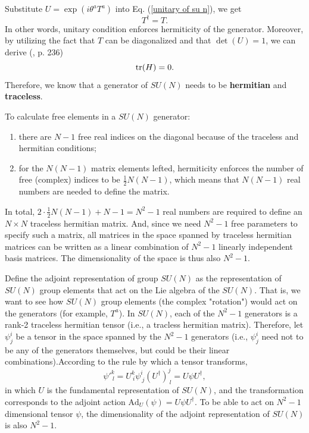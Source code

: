 \documentclass[12pt]{article}
\begin{document}
	
	
	Substitute $U = \exp(i\theta^aT^a)$ into Eq. (\ref{unitary of su n}), we get 
	\begin{equation}
		T^\dagger = T.
	\end{equation}
	In other words, unitary condition enforces hermiticity of the generator. Moreover, by utilizing the fact that $T$ can be diagonalized and that $\det(U) = 1$, we can derive (\cite{azee2016group}, p. 236)
	\begin{equation}
		\tr(H) = 0.
	\end{equation}
	Therefore, we know that a generator of $SU(N)$ needs to be \textbf{hermitian} and \textbf{traceless}. 
	
	To calculate free elements in a $SU(N)$ generator:
	\begin{enumerate}
		\item there are $N-1$ free real indices on the diagonal because of the traceless and hermitian conditions;
		\item for the $N(N-1)$ matrix elements lefted, hermiticity enforces the number of free (complex) indices to be $\frac{1}{2}N(N-1)$, which means that $N(N-1)$ real numbers are needed to define the matrix. 
	\end{enumerate}
	In total, $2 \cdot \frac{1}{2}N(N-1)+N-1 = N^2-1$ real numbers are required to define an $N\times N$ traceless hermitian matrix. And, since we need $N^2-1$ free parameters to specify such a matrix, all matrices in the space spanned by traceless hermitian matrices can be written as a linear combination of $N^2 - 1$ linearly independent basis matrices. The dimensionality of the space is thus also $N^2 - 1$. 
	
	Define the adjoint representation of group $SU(N)$ as the representation of  $SU(N)$ group elements that act on the Lie algebra of the $SU(N)$. That is, we want to see how $SU(N)$ group elements (the complex "rotation") would act on the generators (for example, $T^a$). In $SU(N)$, each of the $N^2 - 1$ generators is a rank-2 traceless hermitian tensor (i.e., a tracless hermitian matrix). Therefore, let $\psi^i_j$ be a tensor in the space spanned by the $N^2 - 1$ generators  (i.e., $\psi^i_j$ need not to be any of the generators themselves, but could be their linear combinations).According to the rule by which a tensor transforms,
	\begin{equation}
		\psi'^k_{\ l} = U^k_{\ i}\psi^i_{\ j} (U^\dagger)^j_{\ l} = U\psi U^\dagger,
	\end{equation}
	in which $U$ is the fundamental representation of $SU(N)$, and the transformation corresponds to the adjoint action $\text{Ad}_U(\psi) = U\psi U^\dagger$. To be able to act on $N^2 - 1$ dimensional tensor $\psi$, the dimensionality of the adjoint representation of $SU (N)$ is also $N^2 -1$. 
	
\end{document}
